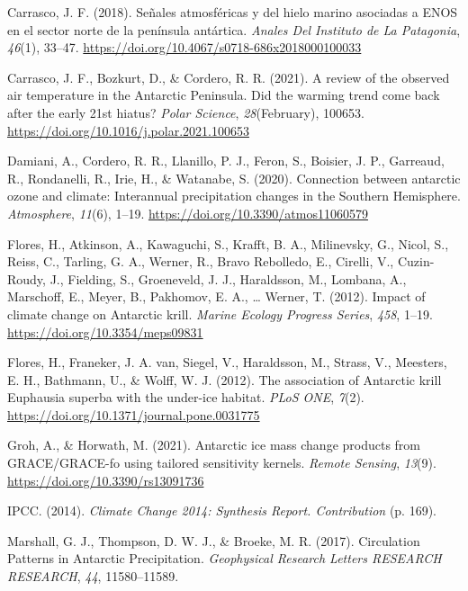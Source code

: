 \documentclass[
]{article}
\newlength{\cslhangindent}
\newenvironment{cslreferences}%
  {\setlength{\parindent}{0pt}%
  \everypar{\setlength{\hangindent}{\cslhangindent}}\ignorespaces}%
  {\par}
\begin{document}
\hypertarget{refs}{}
\begin{cslreferences}
\leavevmode\hypertarget{ref-Carrasco2018}{}%
Carrasco, J. F. (2018). Señales atmosféricas y del hielo marino
asociadas a ENOS en el sector norte de la península antártica.
\emph{Anales Del Instituto de La Patagonia}, \emph{46}(1), 33--47.
\url{https://doi.org/10.4067/s0718-686x2018000100033}

\leavevmode\hypertarget{ref-Carrasco2021b}{}%
Carrasco, J. F., Bozkurt, D., \& Cordero, R. R. (2021). A review of the
observed air temperature in the Antarctic Peninsula. Did the warming
trend come back after the early 21st hiatus? \emph{Polar Science},
\emph{28}(February), 100653.
\url{https://doi.org/10.1016/j.polar.2021.100653}

\leavevmode\hypertarget{ref-Damiani2020}{}%
Damiani, A., Cordero, R. R., Llanillo, P. J., Feron, S., Boisier, J. P.,
Garreaud, R., Rondanelli, R., Irie, H., \& Watanabe, S. (2020).
Connection between antarctic ozone and climate: Interannual
precipitation changes in the Southern Hemisphere. \emph{Atmosphere},
\emph{11}(6), 1--19. \url{https://doi.org/10.3390/atmos11060579}

\leavevmode\hypertarget{ref-Flores2012}{}%
Flores, H., Atkinson, A., Kawaguchi, S., Krafft, B. A., Milinevsky, G.,
Nicol, S., Reiss, C., Tarling, G. A., Werner, R., Bravo Rebolledo, E.,
Cirelli, V., Cuzin-Roudy, J., Fielding, S., Groeneveld, J. J.,
Haraldsson, M., Lombana, A., Marschoff, E., Meyer, B., Pakhomov, E. A.,
\ldots{} Werner, T. (2012). Impact of climate change on Antarctic krill.
\emph{Marine Ecology Progress Series}, \emph{458}, 1--19.
\url{https://doi.org/10.3354/meps09831}

\leavevmode\hypertarget{ref-Flores2012a}{}%
Flores, H., Franeker, J. A. van, Siegel, V., Haraldsson, M., Strass, V.,
Meesters, E. H., Bathmann, U., \& Wolff, W. J. (2012). The association
of Antarctic krill Euphausia superba with the under-ice habitat.
\emph{PLoS ONE}, \emph{7}(2).
\url{https://doi.org/10.1371/journal.pone.0031775}

\leavevmode\hypertarget{ref-Groh2021}{}%
Groh, A., \& Horwath, M. (2021). Antarctic ice mass change products from
GRACE/GRACE-fo using tailored sensitivity kernels. \emph{Remote
Sensing}, \emph{13}(9). \url{https://doi.org/10.3390/rs13091736}

\leavevmode\hypertarget{ref-IPCC2014}{}%
IPCC. (2014). \emph{Climate Change 2014: Synthesis Report. Contribution}
(p. 169).

\leavevmode\hypertarget{ref-Marshall2017}{}%
Marshall, G. J., Thompson, D. W. J., \& Broeke, M. R. (2017).
Circulation Patterns in Antarctic Precipitation. \emph{Geophysical
Research Letters RESEARCH RESEARCH}, \emph{44}, 11580--11589.


\end{cslreferences}
\end{document}
